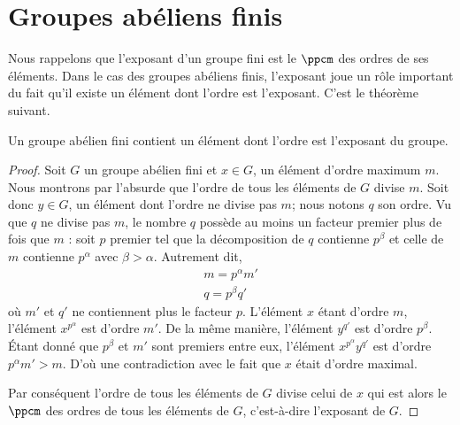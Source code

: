 \section{Groupes abéliens finis}

Nous rappelons que l'exposant d'un groupe fini est le \( \ppcm\) des ordres de ses éléments. Dans le cas des groupes abéliens finis, l'exposant joue un rôle important du fait qu'il existe un élément dont l'ordre est l'exposant. C'est le théorème suivant.

\begin{theorem}
	Un groupe abélien fini contient un élément dont l'ordre est l'exposant du groupe.
\end{theorem}

\begin{proof}
	Soit \( G\) un groupe abélien fini et \( x\in G\), un élément d'ordre maximum \( m\). Nous montrons par l'absurde que l'ordre de tous les éléments de \( G\) divise \( m\). Soit donc \( y\in G\), un élément dont l'ordre ne divise pas \( m\); nous notons \( q\) son ordre. Vu que \( q\) ne divise pas \( m\), le nombre \( q\) possède au moins un facteur premier plus de fois que \( m\) : soit \( p\) premier tel que la décomposition de \( q\) contienne \( p^{\beta}\) et celle de \( m\) contienne \( p^{\alpha}\) avec \( \beta>\alpha\). Autrement dit,
	\begin{subequations}
		\begin{align}
			m=p^{\alpha}m' \\
			q=p^{\beta}q'
		\end{align}
	\end{subequations}
	où \( m'\) et \( q'\) ne contiennent plus le facteur \( p\). L'élément \( x\) étant d'ordre \( m\), l'élément \( x^{p^{\alpha}}\) est d'ordre \( m'\). De la même manière, l'élément \( y^{q'}\) est d'ordre \( p^{\beta}\). Étant donné que \( p^{\beta}\) et \( m'\) sont premiers entre eux, l'élément  \( x^{p^{\alpha}}y^{q'}\) est d'ordre \( p^{\alpha}m'>m\). D'où une contradiction avec le fait que \( x\) était d'ordre maximal.

	Par conséquent l'ordre de tous les éléments de \( G\) divise celui de \( x\) qui est alors le \( \ppcm\) des ordres de tous les éléments de \( G\), c'est-à-dire l'exposant de \( G\).
\end{proof}

